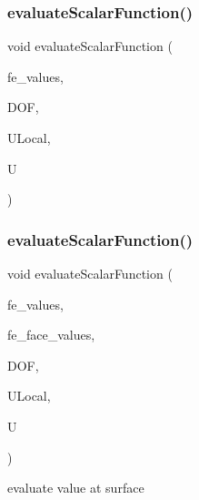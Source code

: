 \subsubsection{\texorpdfstring{evaluate\+Scalar\+Function()}{evaluateScalarFunction()}\hspace{0.1cm}{\footnotesize\ttfamily [1/2]}}
{\footnotesize\ttfamily void evaluate\+Scalar\+Function (\begin{DoxyParamCaption}\item[{const F\+E\+Values$<$ dim $>$ \&}]{fe\+\_\+values,  }\item[{unsigned int}]{D\+OF,  }\item[{Table$<$ 1, T $>$ \&}]{U\+Local,  }\item[{Table$<$ 1, T $>$ \&}]{U }\end{DoxyParamCaption})}

\mbox{\label{group___evaluation_functions_ga2e2fbeb2173113c6889c73bbb7304789}} 
\subsubsection{\texorpdfstring{evaluate\+Scalar\+Function()}{evaluateScalarFunction()}\hspace{0.1cm}{\footnotesize\ttfamily [2/2]}}
{\footnotesize\ttfamily void evaluate\+Scalar\+Function (\begin{DoxyParamCaption}\item[{const F\+E\+Values$<$ dim $>$ \&}]{fe\+\_\+values,  }\item[{const F\+E\+Face\+Values$<$ dim $>$ \&}]{fe\+\_\+face\+\_\+values,  }\item[{unsigned int}]{D\+OF,  }\item[{Table$<$ 1, T $>$ \&}]{U\+Local,  }\item[{Table$<$ 1, T $>$ \&}]{U }\end{DoxyParamCaption})}

evaluate value at surface \mbox{\label{group___evaluation_functions_ga3ee6127c2c5c8333bb7fb384dcdb431f}} 
